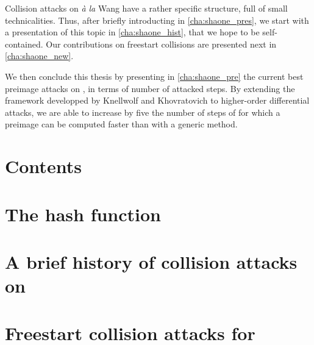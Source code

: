 Collision attacks on \shaone \emph{à la} Wang have a rather specific structure, full of small technicalities. Thus, after briefly
introducting \shaone in \autoref{cha:shaone_pres}, we start with a presentation of this topic in \autoref{cha:shaone_hist},
that we hope to be self-contained. Our contributions on freestart collisions are presented next in \autoref{cha:shaone_new}.

We then conclude this thesis by presenting in \autoref{cha:shaone_pre}
the current best preimage attacks on \shaone, in terms of number of attacked steps. By extending the framework developped by Knellwolf and Khovratovich to
higher-order differential attacks, we are able to increase by five the number of steps of \shaone for which a preimage can be computed faster than with
a generic method.



\cleardoublepage
\chapter*{Contents}
\parttoc





\chapter[Présentation de \shaone]
        {The \shaone hash function}
\label{cha:shaone_pres}
\pagestyle{ruled}






\chapter[Une brève histoire des attaques en collision sur \shaone]
        {A brief history of collision attacks on \shaone}
\label{cha:shaone_hist}



\chapter[Collisions à initialisation libres pour \shaone]
        {Freestart collision attacks for \shaone}
\label{cha:shaone_new}

